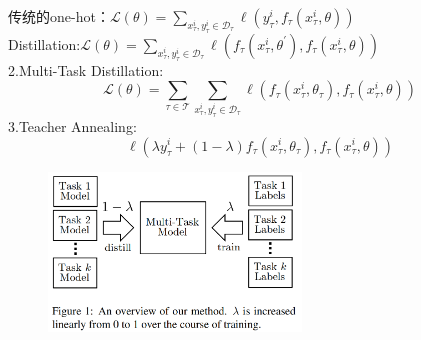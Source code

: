 \documentclass[a4paper,UTF8]{article}
\numberwithin{equation}{section}
\begin{document}
传统的one-hot：$\mathcal{L}(\theta)=\sum_{x_{\tau}^{i}, y_{\tau}^{i} \in \mathcal{D}_{\tau}} \ell\left(y_{\tau}^{i}, f_{\tau}\left(x_{\tau}^{i}, \theta\right)\right)$\\

Distillation:$\mathcal{L}(\theta)=\sum_{x_{\tau}^{i}, y_{\tau}^{i} \in \mathcal{D}_{\tau}} \ell\left(f_{\tau}\left(x_{\tau}^{i}, \theta^{\prime}\right), f_{\tau}\left(x_{\tau}^{i}, \theta\right)\right)$\\
2.Multi-Task Distillation:\\$$
\mathcal{L}(\theta)=\sum_{\tau \in \mathcal{T}} \sum_{x_{\tau}^{i}, y_{\tau}^{i} \in \mathcal{D}_{\tau}} \ell\left(f_{\tau}\left(x_{\tau}^{i}, \theta_{\tau}\right), f_{\tau}\left(x_{\tau}^{i}, \theta\right)\right)
$$
3.Teacher Annealing:
$$
\ell\left(\lambda y_{\tau}^{i}+(1-\lambda) f_{\tau}\left(x_{\tau}^{i}, \theta_{\tau}\right), f_{\tau}\left(x_{\tau}^{i}, \theta\right)\right)
$$
\begin{figure}[H]
	\centering
	\includegraphics[width=0.6\textwidth]{4-1.png}
\end{figure}

\newpage
\end{document}
